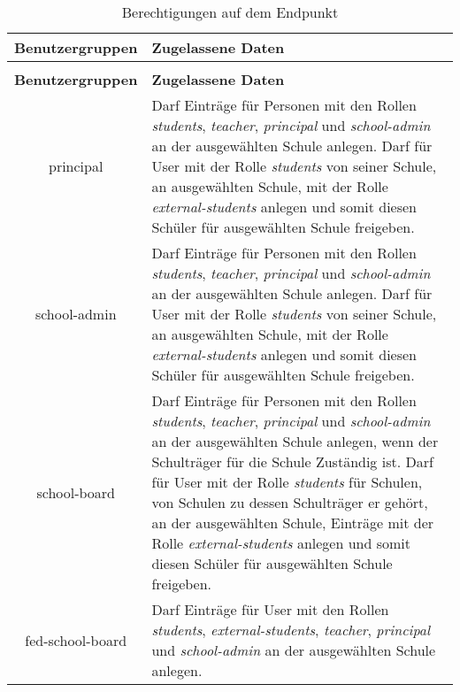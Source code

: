 \begin{longtable}{|c|p{}|}
		\caption{Berechtigungen auf dem Endpunkt}
		\label{tab:rest:api:school:users:id:create:right} \\
\hline
\textbf{Benutzergruppen} & \textbf{Zugelassene Daten} \\ \hline
\endfirsthead
\caption{Berechtigungen auf dem Endpunkt}\\
\hline
\textbf{Benutzergruppen} & \textbf{Zugelassene Daten} \\ \hline
\endhead
principal & Darf Einträge für Personen mit den Rollen \textit{students}, \textit{teacher}, \textit{principal} und \textit{school-admin} an der ausgewählten Schule anlegen.
            Darf für User mit der Rolle \textit{students} von seiner Schule, an ausgewählten Schule, mit der Rolle \textit{external-students} anlegen und somit diesen Schüler für ausgewählten Schule freigeben.\\ \hline
school-admin & Darf Einträge für Personen mit den Rollen \textit{students}, \textit{teacher}, \textit{principal} und \textit{school-admin} an der ausgewählten Schule anlegen.
            Darf für User mit der Rolle \textit{students} von seiner Schule, an ausgewählten Schule, mit der Rolle \textit{external-students} anlegen und somit diesen Schüler für ausgewählten Schule freigeben.  \\ \hline
school-board & Darf Einträge für Personen mit den Rollen \textit{students}, \textit{teacher}, \textit{principal} und \textit{school-admin} an der ausgewählten Schule anlegen, wenn der Schulträger für die Schule Zuständig ist.
            Darf für User mit der Rolle \textit{students} für Schulen, von Schulen zu dessen Schulträger er gehört, an der ausgewählten Schule, Einträge mit der Rolle \textit{external-students} anlegen und somit diesen Schüler für ausgewählten Schule freigeben. \\ \hline
fed-school-board & Darf Einträge für User mit den Rollen \textit{students}, \textit{external-students}, \textit{teacher}, \textit{principal} und \textit{school-admin} an der ausgewählten Schule anlegen.\\ \hline
	\end{longtable}